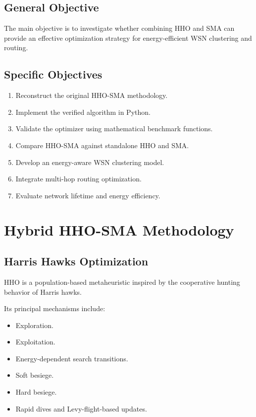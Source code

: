 \documentclass[12pt,a4paper]{report}
\begin{document}
\section{General Objective}

The main objective is to investigate whether combining
HHO and SMA can provide an effective optimization
strategy for energy-efficient WSN clustering and routing.

\section{Specific Objectives}

\begin{enumerate}
    \item Reconstruct the original HHO-SMA methodology.
    \item Implement the verified algorithm in Python.
    \item Validate the optimizer using mathematical
    benchmark functions.
    \item Compare HHO-SMA against standalone HHO and SMA.
    \item Develop an energy-aware WSN clustering model.
    \item Integrate multi-hop routing optimization.
    \item Evaluate network lifetime and energy efficiency.
\end{enumerate}

\chapter{Hybrid HHO-SMA Methodology}

\section{Harris Hawks Optimization}

HHO is a population-based metaheuristic inspired by
the cooperative hunting behavior of Harris hawks.

Its principal mechanisms include:

\begin{itemize}
    \item Exploration.
    \item Exploitation.
    \item Energy-dependent search transitions.
    \item Soft besiege.
    \item Hard besiege.
    \item Rapid dives and Levy-flight-based updates.
\end{itemize}
\end{document}

